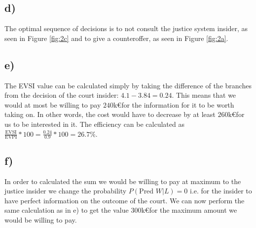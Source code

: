 \documentclass{article}
\begin{document}
\subsection{d)}
	The optimal sequence of decisions is to not consult the justice system insider, as seen in Figure \ref{fig:2c} and to give a counteroffer, as seen in Figure \ref{fig:2a}.
\subsection{e)}
	The EVSI value can be calculated simply by taking the difference of the branches from the decision of the court insider: $4.1 - 3.84 = 0.24$. This means that we would at most be willing to pay $240$k\euro for the information for it to be worth taking on. In other words, the cost would have to decrease by at least $260$k\euro for us to be interested in it.
	The efficiency can be calculated as $\frac{\text{EVSI}}{\text{EVPI}}*100 = \frac{\text{0.24}}{\text{0.9}}*100 = 26.7\%$.
\subsection{f)}
	In order to calculated the sum we would be willing to pay at maximum to the justice insider we change the probability $P(\text{Pred } W|L) = 0$ i.e. for the insider to have perfect information on the outcome of the court. We can now perform the same calculation as in e) to get the value $300$k\euro for the maximum amount we would be willing to pay.  
\end{document}
